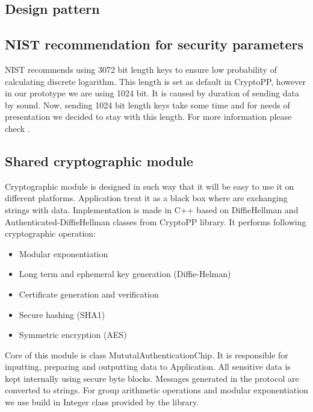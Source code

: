 \documentclass[11pt,titlepage]{article}
\theoremstyle{plain}
\begin{document}
\subsection{Design pattern}

\subsection{NIST recommendation for security parameters}

NIST recommends using 3072 bit length keys to ensure low probability of calculating discrete logarithm. This length is set as default in CryptoPP, however in our prototype we are using 1024 bit. It is caused by duration of sending data by sound. Now, sending 1024 bit length keys take some time and for needs of presentation we decided to stay with this length. For more information please check \cite{NIST}.

\subsection{Shared cryptographic module}
Cryptographic module is designed in such way that it will be easy to use it on different platforms. Application treat it as a black box where are exchanging strings with data. Implementation is made in C++ based on DiffieHellman and Authenticated-DiffieHellman classes from CryptoPP library. It performs following cryptographic operation:

\begin{itemize}
\item Modular exponentiation
\item Long term and ephemeral key generation (Diffie-Helman)
\item Certificate generation and verification
\item Secure hashing (SHA1)
\item Symmetric encryption (AES)
\end{itemize}

Core of this module is class MututalAuthenticationChip. It is responsible for inputting, preparing and outputting data to Application. All sensitive data is kept internally using secure byte blocks. Messages generated in the protocol are converted to strings.
For group arithmetic operations and modular exponentiation we use build in Integer class provided by the library. 

\vspace{5mm}
\end{document}
